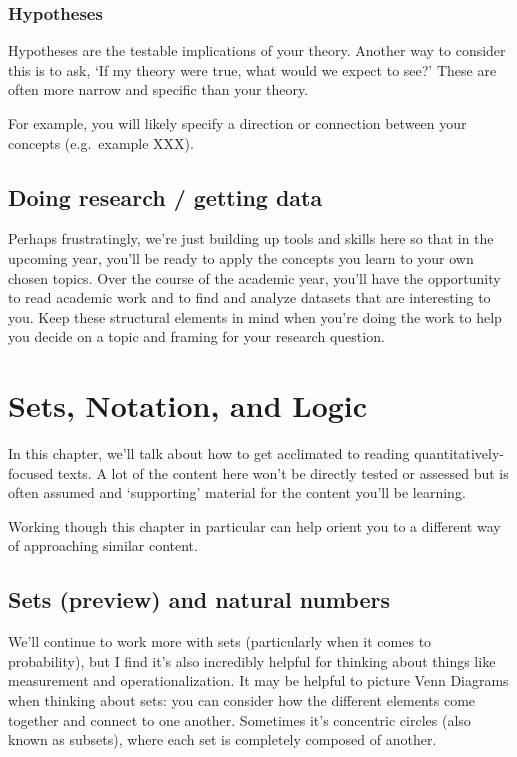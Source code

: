\documentclass[
]{book}
\begin{document}
\hypertarget{hypotheses}{%
\subsection{Hypotheses}\label{hypotheses}}

Hypotheses are the testable implications of your theory. Another way to consider this is to ask, `If my theory were true, what would we expect to see?' These are often more narrow and specific than your theory.

For example, you will likely specify a direction or connection between your concepts (e.g.~example XXX).

\hypertarget{doing-research-getting-data}{%
\section{Doing research / getting data}\label{doing-research-getting-data}}

Perhaps frustratingly, we're just building up tools and skills here so that in the upcoming year, you'll be ready to apply the concepts you learn to your own chosen topics. Over the course of the academic year, you'll have the opportunity to read academic work and to find and analyze datasets that are interesting to you. Keep these structural elements in mind when you're doing the work to help you decide on a topic and framing for your research question.

\hypertarget{sets-notation-and-logic}{%
\chapter{Sets, Notation, and Logic}\label{sets-notation-and-logic}}

In this chapter, we'll talk about how to get acclimated to reading quantitatively-focused texts. A lot of the content here won't be directly tested or assessed but is often assumed and `supporting' material for the content you'll be learning.

Working though this chapter in particular can help orient you to a different way of approaching similar content.

\hypertarget{sets-preview-and-natural-numbers}{%
\section{Sets (preview) and natural numbers}\label{sets-preview-and-natural-numbers}}

We'll continue to work more with sets (particularly when it comes to probability), but I find it's also incredibly helpful for thinking about things like measurement and operationalization. It may be helpful to picture Venn Diagrams when thinking about sets: you can consider how the different elements come together and connect to one another. Sometimes it's concentric circles (also known as subsets), where each set is completely composed of another.
\end{document}
